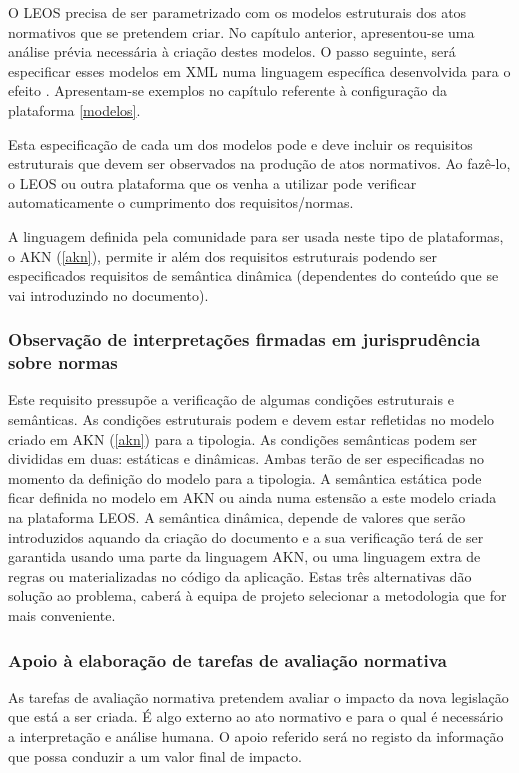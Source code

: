 O LEOS precisa de ser parametrizado com os modelos estruturais dos atos normativos que se pretendem criar.
No capítulo anterior, apresentou-se uma análise prévia necessária à criação destes modelos. 
O passo seguinte, será 
especificar esses modelos em XML numa linguagem específica desenvolvida para o efeito \cite{VPCB2018}.
Apresentam-se exemplos no capítulo referente à configuração da plataforma \ref{modelos}.

Esta especificação de cada um dos modelos pode e deve incluir os requisitos estruturais que devem ser observados na 
produção de atos normativos. Ao fazê-lo, o LEOS ou outra plataforma que os venha a utilizar pode verificar automaticamente 
o cumprimento dos requisitos/normas.

A linguagem definida pela comunidade para ser usada neste tipo de plataformas, o AKN (\ref{akn}), permite 
ir além dos requisitos estruturais podendo ser especificados requisitos de semântica dinâmica (dependentes 
do conteúdo que se vai introduzindo no documento).

\subsubsection{Observação de interpretações firmadas em jurisprudência sobre normas}

Este requisito pressupõe a verificação de algumas condições estruturais e semânticas.
As condições estruturais podem e devem estar refletidas no modelo criado em AKN (\ref{akn}) para a tipologia.
As condições semânticas podem ser divididas em duas: estáticas e dinâmicas.
Ambas terão de ser especificadas no momento da definição do modelo para a tipologia. 
A semântica estática pode ficar definida no modelo em AKN ou ainda numa estensão a este modelo criada na plataforma LEOS.
A semântica dinâmica, depende de valores que serão introduzidos aquando da criação do documento e a sua verificação terá 
de ser garantida usando uma parte da linguagem AKN, ou uma linguagem extra de regras ou materializadas 
no código da aplicação. Estas três alternativas dão solução ao problema, caberá à equipa de projeto 
selecionar a metodologia que for mais conveniente.

\subsubsection{Apoio à elaboração de tarefas de avaliação normativa}

As tarefas de avaliação normativa pretendem avaliar o impacto da nova legislação que está a ser criada.
É algo externo ao ato normativo e para o qual é necessário a interpretação e análise humana.
O apoio referido será no registo da informação que possa conduzir a um valor final de impacto. 

